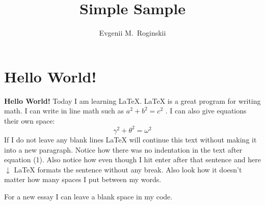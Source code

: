 \documentclass[journal=jacsat,manuscript=article]{achemso}
\author{Evgenii M.~Roginskii}
\affiliation[Ioffe Institute]{Ioffe
Institute, Polytekhnicheskaya 26, 194021 St. Petersburg, Russia}
\title{Simple Sample} %
\begin{document}
\maketitle %

\section{Hello World!} %

\textbf{Hello World!} Today I am learning \LaTeX. %
\LaTeX{} is a great program for writing math. I can write in line math such as $a^2+b^2=c^2$ %
. I can also give equations their own space:
\begin{equation} %
  \gamma^2+\theta^2=\omega^2
\end{equation}
If I do not leave any blank lines \LaTeX{} will continue  this text without making it into a new paragraph.  Notice how there was no indentation in the text after equation (1).
Also notice how even though I hit enter after that sentence and here $\downarrow$
\LaTeX{} formats the sentence without any break.  Also   look  how      it   doesn't     matter          how    many  spaces     I put     between       my    words.

For a new essay I can leave a blank space in my code.
\end{document}
